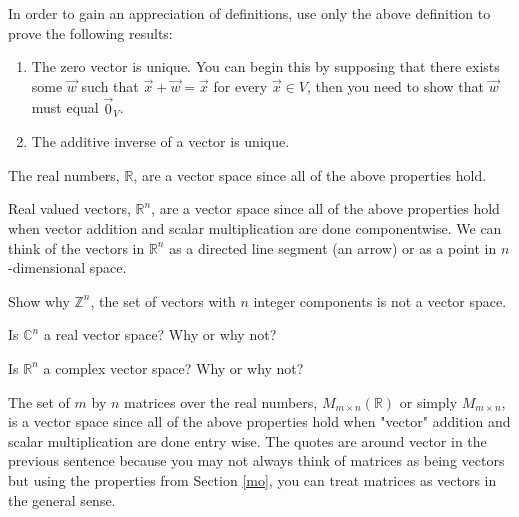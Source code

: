 \bq
In order to gain an appreciation of definitions, use only the above definition to prove the following results:
\begin{enumerate}
\item The zero vector is unique. You can begin this by supposing that there exists some $\vec{w}$ such that $\vec{x} +\vec{w} = \vec{x}$ for every $\vec{x} \in V$, then you need to show that $\vec{w}$ must equal $\vec{0}_V$.
\item The additive inverse of a vector is unique.
\end{enumerate}
\eq

\begin{example}
The real numbers, $\mathbb{R}$, are a vector space since all of the above properties hold.
\end{example}
\begin{example}
Real valued vectors, $\mathbb{R}^n$, are a vector space since all of the above properties hold when vector addition and scalar multiplication are done componentwise. We can think of the vectors in $\mathbb{R}^n$ as a directed line segment (an arrow) or as a point in $n$-dimensional space.
\end{example}

\bq Show why $\mathbb{Z}^n$, the set of vectors with $n$ integer components is not a vector space.
\eq

\bq Is $\mathbb{C}^n$ a real vector space? Why or why not?
\eq

\bq Is $\mathbb{R}^n$ a complex vector space? Why or why not?
\eq

\begin{example}
The set of $m$ by $n$ matrices over the real numbers, $M_{m \times n}(\mathbb{R})$ or simply $M_{m \times n}$, is a vector space since all of the above properties hold when "vector" addition and scalar multiplication are done entry wise. The quotes are around vector in the previous sentence because you may not always think of matrices as being vectors but using the properties from Section \ref{mo}, you can treat matrices as vectors in the general sense.
\end{example}


